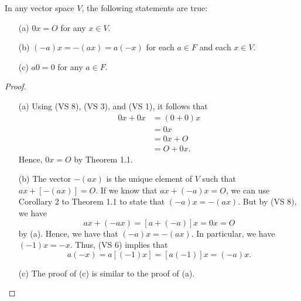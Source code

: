 \begin{theorem}
   In any vector space \( V  \), the following statements are true: \begin{enumerate}
       \item[(a)] \( 0x = O  \) for any \( x \in V  \).
        \item[(b)] \( (-a)x = -(ax) = a(-x)  \) for each \( a \in F  \) and each \( x \in V  \).
        \item[(c)] \( a0 = 0 \) for any \( a \in F  \).
   \end{enumerate} 
\end{theorem}

\begin{proof}
\begin{enumerate}
    \item[(a)] Using (VS 8), (VS 3), and (VS 1), it follows that 
        \begin{align*}
            0x + 0x &= (0+0)x \\
                    &= 0x \\
                    &= 0x + O \\
                    &= O + 0x.
        \end{align*}
        Hence, \( 0x = O  \) by Theorem 1.1.
    \item[(b)] The vector \( -(ax)  \) is the unique element of \( V  \) such that \( a x + [-(ax)] = O \). If we know that \( ax + (-a) x = O  \), we can use Corollary 2 to Theorem 1.1 to state that \( (-a)x = -(ax) \). But by (VS 8), we have
        \[  ax + (-ax) = [a + (-a)]x = 0x = O\] by (a). Hence, we have that \( (-a) x = -(ax)  \). In particular, we have \( (-1)x = -x  \). Thus, (VS 6) implies that 
        \[  a(-x) = a[(-1)x] = [a(-1)]x = (-a)x. \]
    \item[(c)] The proof of (c) is similar to the proof of (a).
\end{enumerate}
\end{proof}


